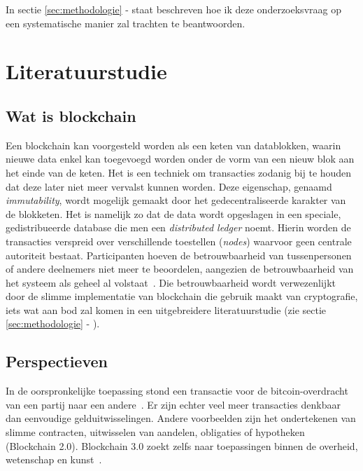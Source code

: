 In sectie \ref{sec:methodologie} -  staat beschreven hoe ik deze onderzoeksvraag op een systematische manier zal trachten te beantwoorden.





\section{Literatuurstudie}
\label{sec:state-of-the-art}

\subsection{Wat is blockchain}
\label{sub:wat-is-blockchain}

Een blockchain kan voorgesteld worden als een keten van datablokken, waarin nieuwe data enkel kan toegevoegd worden onder de vorm van een nieuw blok aan het einde van de keten. Het is een techniek om transacties zodanig bij te houden dat deze later niet meer vervalst kunnen worden. Deze eigenschap, genaamd \textit{immutability}, wordt mogelijk gemaakt door het gedecentraliseerde karakter van de blokketen. Het is namelijk zo dat de data wordt opgeslagen in een speciale, gedistribueerde database die men een \textit{distributed ledger} noemt. Hierin worden de transacties verspreid over verschillende toestellen (\textit{nodes}) waarvoor geen centrale autoriteit bestaat. Participanten hoeven de betrouwbaarheid van tussenpersonen of andere deelnemers niet meer te beoordelen, aangezien de betrouwbaarheid van het systeem als geheel al volstaat~\autocite{Nofer2017}. Die betrouwbaarheid wordt verwezenlijkt door de slimme implementatie van blockchain die gebruik maakt van cryptografie, iets wat aan bod zal komen in een uitgebreidere literatuurstudie (zie sectie \ref{sec:methodologie} - ).



\subsection{Perspectieven}
\label{sub:perspectieven}

In de oorspronkelijke toepassing stond een transactie voor de bitcoin-overdracht van een partij naar een andere~\autocite{Pierro2017}. Er zijn echter veel meer transacties denkbaar dan eenvoudige gelduitwisselingen. Andere voorbeelden zijn het ondertekenen van slimme contracten, uitwisselen van aandelen, obligaties of hypotheken (Blockchain 2.0). Blockchain 3.0 zoekt zelfs naar toepassingen binnen de overheid, wetenschap en kunst~\autocite{Swan2015}.

